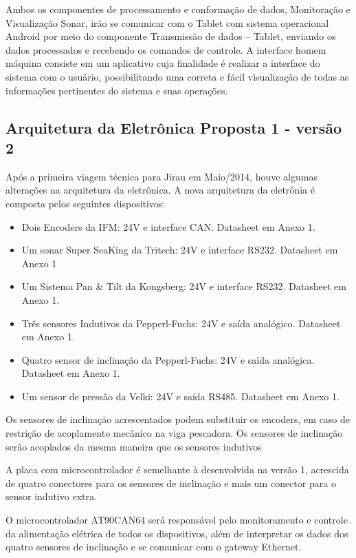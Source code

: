 Ambos os componentes de processamento e conformação de dados, Monitoração e
Visualização Sonar, irão se comunicar com o Tablet com sistema operacional
Android por meio do componente Transmissão de dados – Tablet, enviando os dados
processados e recebendo os comandos de controle.  A interface homem máquina
consiste em um aplicativo cuja finalidade é realizar a interface do sistema com
o usuário, possibilitando uma correta e fácil visualização de todas as
informações pertinentes do sistema e suas operações.

\subsection{Arquitetura da Eletrônica Proposta 1 - versão 2}
Após a primeira viagem técnica para Jirau em Maio/2014, houve algumas alterações
na arquitetura da eletrônica. 
A nova arquitetura da eletrônia é composta pelos seguintes dispositivos:
\begin{itemize}
  \item Dois Encoders da IFM: 24V e interface CAN. Datasheet em Anexo 1.
  \item Um sonar Super SeaKing da Tritech: 24V e interface RS232. Data\-sheet em
  Anexo 1
  \item Um Sistema Pan \& Tilt da Kongsberg: 24V e interface RS232. Data\-sheet
  em Anexo 1.
  \item Três sensores Indutivos da Pepperl-Fuchs: 24V e saída ana\-lógico.
  Data\-sheet em Anexo 1.
  \item Quatro sensor de inclinação da Pepperl-Fuchs: 24V e saída analógica.
  Data\-sheet em Anexo 1.
  \item Um sensor de pressão da Velki: 24V e saída RS485. Datasheet em Anexo 1.
\end{itemize}
Os sensores de inclinação acrescentados podem substituir os encoders, em caso de
restrição de acoplamento mecânico na viga pescadora. 
Os sensores de inclinação serão acoplados da mesma
maneira que os sensores indutivos

A placa com microcontrolador é semelhante à desenvolvida na versão 1,
acrescida de quatro conectores para os sensores de inclinação e mais um
conector para o sensor indutivo extra. 

O microcontrolador AT90CAN64 será responsável pelo monitoramento e controle da
alimentação elétrica de todos os dispositivos, além de interpretar os dados dos
quatro sensores de inclinação e se comunicar com o gateway Ethernet. 

